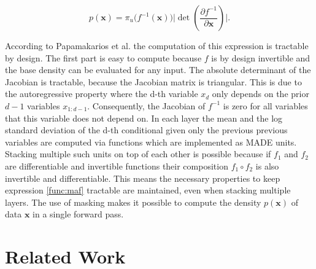\documentclass[11pt,titlepage,oneside,openany]{book}
\begin{document}
\begin{equation}
	\label{func:maf}
	p(\pmb{x}) = \pi_{u} \bigl(f^{-1}(\pmb{x})\bigr) \biggl\lvert \det \left(\frac{\partial f^{-1}}{\partial \pmb{x}} \right) \biggr\rvert.
\end{equation}

\noindent According to Papamakarios et al. \cite{papamakarios_masked_2017} the computation of this expression is tractable by design. The first part is easy to compute because $f$ is by design invertible and the base density can be evaluated for any input. The absolute determinant of the Jacobian is tractable, because the Jacobian matrix is triangular. This is due to the autoregressive property where the d-th variable $x_d$ only depends on the prior $d-1$ variables $x_{1:d-1}$. Consequently, the Jacobian of $f^{-1}$ is zero for all variables that this variable does not depend on. %
In each layer the mean and the log standard deviation of the d-th conditional given only the previous previous variables are computed via functions which are implemented as MADE units. Stacking multiple such units on top of each other is possible because if $f_1$ and $f_2$ are differentiable and invertible functions their composition $f_1 \circ f_2$ is also invertible and differentiable. This means the necessary properties to keep expression \ref{func:maf} tractable are maintained, even when stacking multiple layers. The use of masking makes it possible to compute the density $p(\pmb{x})$ of data $\pmb{x}$ in a single forward pass.


\chapter{Related Work}
\label{cha:rel}
\end{document}
